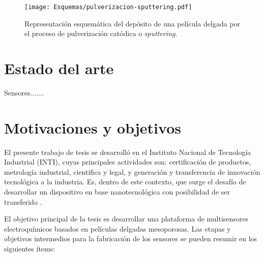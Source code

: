 				\begin{figure}[h!]
 				\begin{center}
 				\texttt{[image: Esquemas/pulverizacion-sputtering.pdf]}
 				\caption[Etapas del proceso de pulverización catódica]{Representación esquemática del depósito de una película delgada por el proceso de pulverización catódica o \textit{sputtering.}}
 		   		\label{fig:sssspputt}
 		    	\end{center}
 		    	\end{figure}			

\section{Estado del arte}
	 		    		

	Sensores.......  		    		
 		    	
\section{Motivaciones y objetivos}

	El presente trabajo de tesis se desarrolló en el Instituto Nacional de Tecnología Industrial (INTI), cuyas principales actividades son: certificación de productos, metrología industrial, científica y legal, y generación y transferencia	de innovación tecnológica a la industria. Es, dentro de este contexto, que surge el desafío de desarrollar un dispositivo en base nanotecnológica con posibilidad de ser transferido . 

	El objetivo principal de la tesis es desarrollar una plataforma de multisensores electroquímicos basados en películas delgadas mesoporosas. Las etapas y objetivos intermedios para la fabricación de los sensores se pueden resumir en los siguientes ítems:


